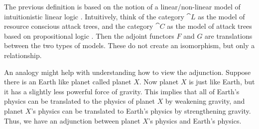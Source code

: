 \begin{full}
The previous definition is based on the notion of a linear/non-linear
model of intuitionistic linear logic \cite{Benton:1994}.  Intuitively,
think of the category $\cat{L}$ as the model of resource conscious
attack trees, and the category $\cat{C}$ as the model of attack trees
based on propositional logic \cite{Kordy:2014,Kordy:2012}.  Then the
adjoint functors $F$ and $G$ are translations between the two types of
models.  These do not create an isomorphism, but only a relationship.

An analogy might help with understanding how to view the adjunction.
Suppose there is an Earth like planet called planet $X$.  Now planet
$X$ is just like Earth, but it has a slightly less powerful force of
gravity.  This implies that all of Earth's physics can be translated
to the physics of planet $X$ by weakening gravity, and planet $X$'s
physics can be translated to Earth's physics by strengthening gravity.
Thus, we have an adjunction between planet $X$'s physics and Earth's
physics.


\end{full}
